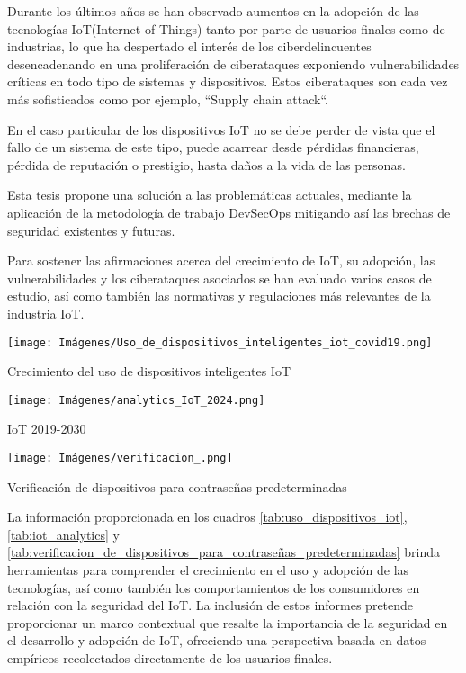 Durante los últimos años se han observado aumentos en la adopción de las tecnologías IoT(Internet of Things) tanto por parte de usuarios finales como de industrias, lo que ha despertado el interés de los ciberdelincuentes desencadenando en una proliferación de ciberataques exponiendo vulnerabilidades críticas en todo tipo de sistemas y dispositivos. Estos ciberataques son cada vez más sofisticados como por ejemplo, ``Supply chain attack``. 

En el caso particular de los dispositivos IoT no se debe perder de vista que el fallo de un sistema de este tipo, puede acarrear desde pérdidas financieras, pérdida de reputación o prestigio, hasta daños a la vida de las personas. 

Esta tesis propone una solución a las problemáticas actuales, mediante la aplicación de la metodología de trabajo DevSecOps mitigando así las brechas de seguridad existentes y futuras.

Para sostener las afirmaciones acerca del crecimiento de IoT, su adopción, las vulnerabilidades y los ciberataques asociados se han evaluado varios casos de estudio, así como también las normativas y regulaciones más relevantes de la industria IoT.

\begin{table}[ht]
    \centering
        \texttt{[image: Imágenes/Uso\_de\_dispositivos\_inteligentes\_iot\_covid19.png]} 
    \caption{Crecimiento del uso de dispositivos inteligentes IoT}
    \label{tab:uso_dispositivos_iot}
\end{table}

\begin{table}[ht]
    \centering
        \texttt{[image: Imágenes/analytics\_IoT\_2024.png]}
    \caption{IoT 2019-2030}
    \label{tab:iot_analytics}
\end{table}

\begin{table}[ht]
    \centering
        \texttt{[image: Imágenes/verificacion\_.png]}
    \caption{Verificación de dispositivos para contraseñas predeterminadas}
    \label{tab:verificacion_de_dispositivos_para_contraseñas_predeterminadas}
\end{table}


La información proporcionada en los cuadros \ref{tab:uso_dispositivos_iot}, \ref{tab:iot_analytics} y \ref{tab:verificacion_de_dispositivos_para_contraseñas_predeterminadas} brinda herramientas para comprender el crecimiento en el uso y adopción de las tecnologías, así como también los comportamientos de los consumidores en relación con la seguridad del IoT. La inclusión de estos informes pretende proporcionar un marco contextual que resalte la importancia de la seguridad en el desarrollo y adopción de IoT, ofreciendo una perspectiva basada en datos empíricos recolectados directamente de los usuarios finales. \cite{ipsos2021iot} \cite{Sinha2023}

